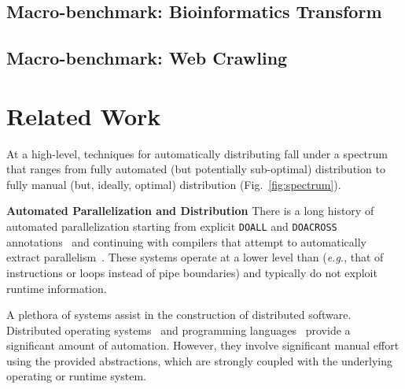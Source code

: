\documentclass[sigplan,10pt,review,anonymous]{acmart}
\newcommand{\eg}{{\em e.g.}, }
\newcommand{\heading}[1]{\vspace{4pt}\noindent\textbf{#1}\enspace}
\newcommand{\ttt}[1]{\texttt{\small #1}}
\newcommand{\TODO}[1]{\hl{\textbf{TODO:} #1}\xspace}
\begin{document}
\subsection{Macro-benchmark: Bioinformatics Transform}
\label{macro3}

\subsection{Macro-benchmark: Web Crawling}
\label{macro2}

\section{Related Work}
\label{related}

At a high-level, techniques for automatically distributing fall under a spectrum that ranges from fully automated (but potentially sub-optimal) distribution to fully manual (but, ideally, optimal) distribution (Fig.~\ref{fig:spectrum}).

\heading{Automated Parallelization and Distribution}
There is a long history of automated parallelization starting from explicit \ttt{DOALL} and \ttt{DOACROSS} annotations~\cite{par1, par2} and continuing with compilers that attempt to automatically extract parallelism~\cite{padua1993polaris,hall1996maximizing}.
These systems operate at a lower level than \sys (\eg that of instructions or loops instead of pipe boundaries) and typically do not exploit runtime information.

A plethora of systems assist in the construction of distributed software.
Distributed operating systems~\cite{rashid1981accent, walker1983locus, ousterhout1988sprite, mullender1990amoeba, pike1990plan9, rozier1991overview, dorward1997inferno, barak1998mosix, schwarzkopf2013dios, sacha2013osprey} and programming languages~\cite{erlang:96, acute:05, mace:07, cloudhaskell:11}
provide a significant amount of automation. %
However, they involve significant manual effort using the provided abstractions, which are strongly coupled with the underlying operating or runtime system.
\end{document}
